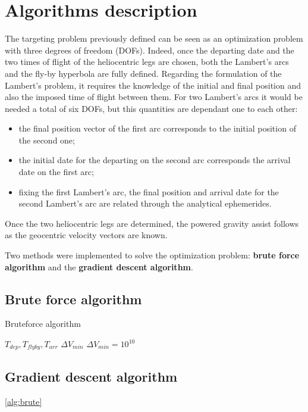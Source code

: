 \section{Algorithms description}
\label{sec:algo_description}

The targeting problem previously defined can be seen as an optimization problem with three degrees of freedom (DOFs). Indeed, once the departing date and the two times of flight of the heliocentric legs are chosen, both the Lambert's arcs and the fly-by hyperbola are fully defined.  
Regarding the formulation of the Lambert's problem, it requires the knowledge of the initial and final position and also the imposed time of flight between them. For two Lambert's arcs it would be needed a total of six DOFs, but this quantities are dependant one to each other:
\begin{itemize}
    [wide,itemsep=3pt,topsep=3pt]
    \item the final position vector of the first arc corresponds to the initial position of the second one;
    \item the initial date for the departing on the second arc corresponds the arrival date on the first arc;
    \item fixing the first Lambert's arc, the final position and arrival date for the second Lambert's arc are related through the analytical ephemerides.
\end{itemize}

Once the two heliocentric legs are determined, the powered gravity assist follows as the geocentric velocity vectors are known.

Two methods were implemented to solve the optimization problem: \textbf{brute force algorithm} and the \textbf{gradient descent algorithm}.

\subsection{Brute force algorithm}
\label{subsec:brute_force_algo}

\begin{algorithm}
    \caption{Bruteforce algorithm} \label{alg:brute}
    \begin{algorithmic}
    \Require $T_{dep}, T_{fly by}, T_{arr}$
    \Ensure $\Delta V_{min}$
    \State $\Delta V_{min} = 10^{10}$
                \State 
            \EndFor
        \EndFor
    \EndFor
    \end{algorithmic}
\end{algorithm}


\subsection{Gradient descent algorithm}
\label{subsec:gradient_algo}

\autoref{alg:brute}